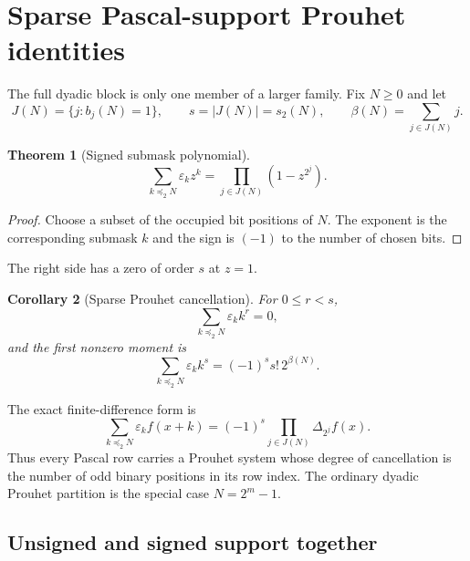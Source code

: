 \documentclass[11pt,oneside]{article}
\newtheorem{theorem}{Theorem}[section]
\newtheorem{corollary}[theorem]{Corollary}
\theoremstyle{definition}
\theoremstyle{remark}
\newcommand{\bitsum}{s_2}
\newcommand{\eps}{\varepsilon}
\newcommand{\submask}{\preccurlyeq_2}
\begin{document}
\section{Sparse Pascal-support Prouhet identities}\label{sec:sparse-prouhet}

The full dyadic block is only one member of a larger family.  Fix $N\ge0$ and
let
\begin{equation}\label{eq:occupied-bits}
 J(N)=\{j:b_j(N)=1\},
 \qquad s=|J(N)|=\bitsum(N),
 \qquad \beta(N)=\sum_{j\in J(N)}j.
\end{equation}

\begin{theorem}[Signed submask polynomial]\label{thm:signed-submask-product}
\begin{equation}\label{eq:signed-submask-product}
 \boxed{\quad
 \sum_{k\submask N}\eps_kz^k
 =\prod_{j\in J(N)}(1-z^{2^j}).
 \quad}
\end{equation}
\end{theorem}

\begin{proof}
Choose a subset of the occupied bit positions of $N$.  The exponent is the
corresponding submask $k$ and the sign is $(-1)$ to the number of chosen bits.
\end{proof}

The right side has a zero of order $s$ at $z=1$.

\begin{corollary}[Sparse Prouhet cancellation]\label{cor:sparse-prouhet}
For $0\le r<s$,
\begin{equation}\label{eq:sparse-prouhet}
 \sum_{k\submask N}\eps_kk^r=0,
\end{equation}
and the first nonzero moment is
\begin{equation}\label{eq:sparse-first-moment}
 \sum_{k\submask N}\eps_kk^s
 =(-1)^s s!\,2^{\beta(N)}.
\end{equation}
\end{corollary}

The exact finite-difference form is
\begin{equation}\label{eq:sparse-finite-difference}
 \sum_{k\submask N}\eps_kf(x+k)
 =(-1)^s\prod_{j\in J(N)}\Delta_{2^j}f(x).
\end{equation}
Thus every Pascal row carries a Prouhet system whose degree of cancellation is
the number of odd binary positions in its row index.  The ordinary dyadic
Prouhet partition is the special case $N=2^m-1$.

\subsection{Unsigned and signed support together}
\end{document}

